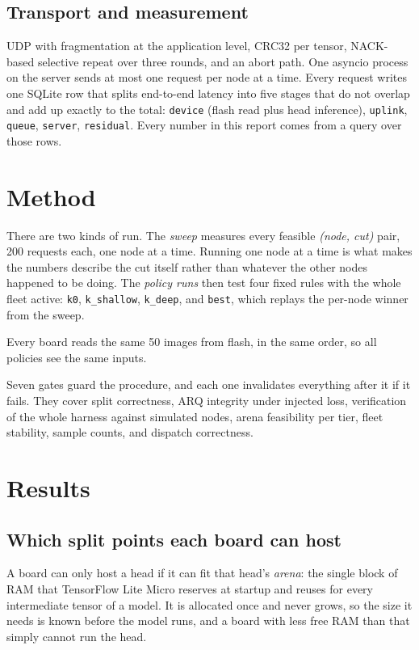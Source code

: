 \documentclass[11pt,a4paper]{article}
\begin{document}
\subsection{Transport and measurement}

UDP with fragmentation at the application level, CRC32 per tensor, NACK-based
selective repeat over three rounds, and an abort path. One asyncio process on
the server sends at most one request per node at a time. Every request writes one
SQLite row that splits end-to-end latency into five stages that do not overlap
and add up exactly to the total: \texttt{device} (flash read plus head
inference), \texttt{uplink}, \texttt{queue}, \texttt{server}, \texttt{residual}.
Every number in this report comes from a query over those rows.

\section{Method}

There are two kinds of run. The \emph{sweep} measures every feasible
\emph{(node, cut)} pair, 200 requests each, one node at a time. Running one node
at a time is what makes the numbers describe the cut itself rather than whatever
the other nodes happened to be doing. The \emph{policy runs} then test four fixed
rules with the whole fleet active: \texttt{k0}, \texttt{k\_shallow},
\texttt{k\_deep}, and \texttt{best}, which replays the per-node winner from the
sweep.

Every board reads the same 50 images from flash, in the same order, so all
policies see the same inputs.

Seven gates guard the procedure, and each one invalidates everything after it if
it fails. They cover split correctness, ARQ integrity under injected loss,
verification of the whole harness against simulated nodes, arena feasibility per
tier, fleet stability, sample counts, and dispatch correctness.

\section{Results}

\subsection{Which split points each board can host}

A board can only host a head if it can fit that head's \emph{arena}: the single
block of RAM that TensorFlow Lite Micro reserves at startup and reuses for every
intermediate tensor of a model. It is allocated once and never grows, so the
size it needs is known before the model runs, and a board with less free RAM
than that simply cannot run the head.
\end{document}
